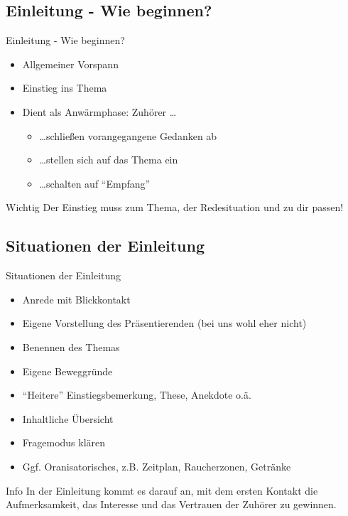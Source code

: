 \subsection{Einleitung - Wie beginnen?}
\begin{frame}{Einleitung - Wie beginnen?}
    \begin{itemize}[<+->]
        \item Allgemeiner Vorspann
        \item Einstieg ins Thema
        \item Dient als Anwärmphase: Zuhörer \dots
           \begin{itemize}[<+->]
            \item \dots schließen vorangegangene Gedanken ab
            \item \dots stellen sich auf das Thema ein
            \item \dots schalten auf "`Empfang"'
           \end{itemize}
    \end{itemize}

    \pause[\thebeamerpauses]
    \begin{alertblock}{Wichtig}
        Der Einstieg muss zum Thema, der Redesituation und zu dir
        passen!
    \end{alertblock}
\end{frame}

\subsection{Situationen der Einleitung}
\begin{frame}{Situationen der Einleitung}
    \begin{itemize}[<+->]
        \item Anrede mit Blickkontakt
        \item Eigene Vorstellung des Präsentierenden (bei uns wohl eher nicht)
        \item Benennen des Themas
        \item Eigene Beweggründe
        \item "`Heitere"' Einstiegsbemerkung, These, Anekdote o.ä.
        \item Inhaltliche Übersicht
        \item Fragemodus klären 
        \item Ggf. Oranisatorisches, z.B. Zeitplan, Raucherzonen, Getränke
    \end{itemize}

    \pause[\thebeamerpauses]
    \begin{block}{Info}
        In der Einleitung kommt es darauf an, mit dem ersten Kontakt
        die Aufmerksamkeit, das Interesse und das Vertrauen der 
        Zuhörer zu gewinnen.
    \end{block}
\end{frame}

